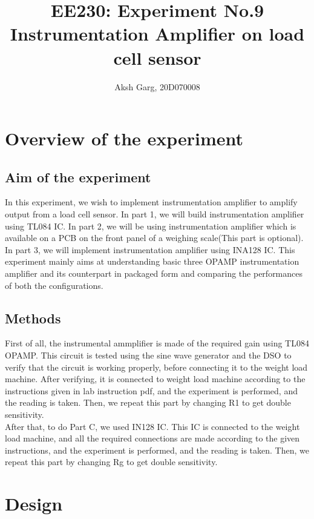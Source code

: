 \documentclass[12pt]{article}
\title{EE230: Experiment No.9\\
Instrumentation Amplifier on load cell sensor}
\author{Aksh Garg, 20D070008}
\begin{document}
\maketitle
 

\section{Overview of the experiment} %

\subsection{Aim of the experiment}%

In this experiment, we wish to implement instrumentation amplifier to amplify output from a load cell sensor. In part 1, we will build instrumentation amplifier using TL084 IC. In part 2, we will be using instrumentation amplifier which is available on a PCB on the front panel of a weighing scale(This part is optional). In part 3, we will implement instrumentation amplifier using INA128 IC. This experiment mainly aims at understanding basic three OPAMP instrumentation amplifier and its counterpart in packaged form and comparing the performances of both the configurations.

\subsection{Methods}
First of all, the instrumental ammplifier is made of the required gain using TL084 OPAMP. This circuit is tested using the sine wave generator and the DSO to verify that the circuit is working properly, before connecting it to the weight load machine. After verifying, it is connected to weight load machine according to the instructions given in lab instruction pdf, and the experiment is performed, and the reading is taken. Then, we repeat this part by changing R1 to get double sensitivity.\\
After that, to do Part C, we used IN128 IC. This IC is connected to the weight load machine, and all the required connections are made according to the given instructions, and the experiment is performed, and the reading is taken. Then, we repeat this part by changing Rg to get double sensitivity.\\


\section{Design}%
\end{document}
